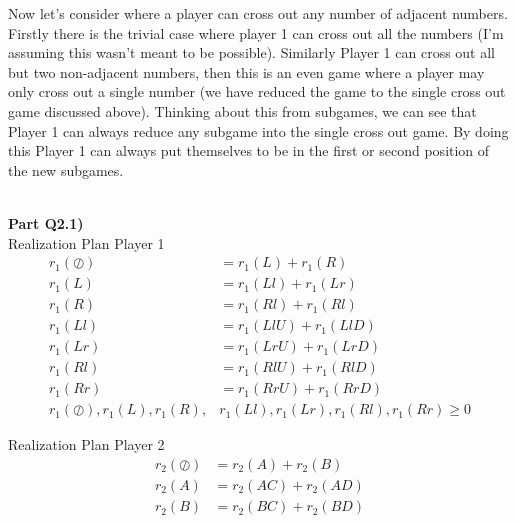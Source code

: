 \documentclass[12pt,letter]{article}
\newcommand{\ppart}[1]{\vspace{2mm}\large\textbf{\\Part {#1})\vspace{2mm}}\normalsize\\}
\begin{document}
Now let's consider where a player can cross out any number of adjacent numbers.
Firstly there is the trivial case where player 1 can cross out all the numbers
(I'm assuming this wasn't meant to be possible).
Similarly Player 1 can cross out all but two non-adjacent numbers, then this
is an even game where a player may only cross out a single number (we have 
reduced the game to the single cross out game discussed above). Thinking about
this from subgames, we can see that Player 1 can always reduce any subgame into
the single cross out game. By doing this Player 1 can always put themselves
to be in the first or second position of the new subgames.

\ppart{Q2.1}
Realization Plan Player 1
\begin{align*}
    r_1(\oslash) &= r_1(L) + r_1(R) \\
    r_1(L) &= r_1(Ll) + r_1(Lr)\\
    r_1(R) &= r_1(Rl) + r_1(Rl)\\
    r_1(Ll) &= r_1(LlU) + r_1(LlD)\\
    r_1(Lr) &= r_1(LrU) + r_1(LrD)\\
    r_1(Rl) &= r_1(RlU) + r_1(RlD)\\
    r_1(Rr) &= r_1(RrU) + r_1(RrD)\\
    r_1(\oslash),r_1(L),r_1(R),&r_1(Ll),r_1(Lr),r_1(Rl),r_1(Rr) \geq 0
\end{align*}

Realization Plan Player 2
\begin{align*}
    r_2(\oslash) &= r_2(A) + r_2(B)\\
    r_2(A) &= r_2(AC) + r_2(AD)\\
    r_2(B) &= r_2(BC) + r_2(BD)\\
\end{align*}
\end{document}
